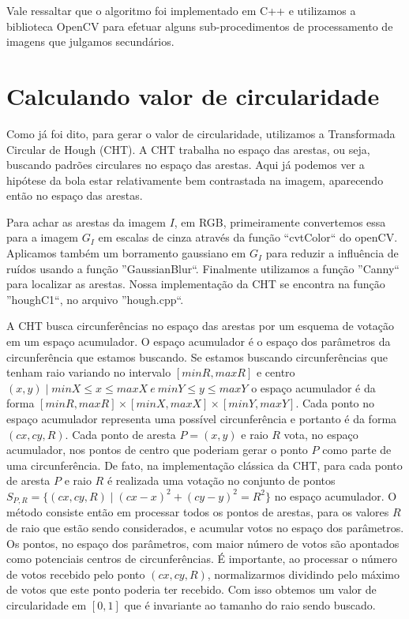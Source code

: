 \documentclass[11pt,a4paper]{article}
\begin{document}
Vale ressaltar que o algoritmo foi implementado em C++ e utilizamos a biblioteca OpenCV para efetuar alguns sub-procedimentos de processamento de imagens que julgamos secundários.

\section{Calculando valor de circularidade}

 Como já foi dito, para gerar o valor de circularidade, utilizamos a Transformada Circular de Hough (CHT). A CHT trabalha no espaço das arestas, ou seja, buscando padrões circulares no espaço das arestas. Aqui já podemos ver a hipótese da bola estar relativamente bem contrastada na imagem, aparecendo então no espaço das arestas.

 Para achar as arestas da imagem $I$, em RGB, primeiramente convertemos essa para a imagem $G_I$ em escalas de cinza através da função ``cvtColor`` do openCV. Aplicamos também um borramento gaussiano em $G_I$ para reduzir a influência de ruídos usando a função ''GaussianBlur``. Finalmente utilizamos a função ''Canny`` para localizar as arestas. Nossa implementação da CHT se encontra na função ''houghC1``, no arquivo ''hough.cpp``.

 A CHT busca circunferências no espaço das arestas por um esquema de votação em um espaço acumulador. O espaço acumulador é o espaço dos parâmetros da circunferência que estamos buscando. Se estamos buscando circunferências que tenham raio variando no intervalo $[minR,maxR]$ e centro $(x,y) \mid minX \leq x \leq maxX ~e~ minY \leq y \leq maxY $ o espaço acumulador é da forma $[minR,maxR]\times[minX,maxX]\times[minY,maxY]$. Cada ponto no espaço acumulador representa uma possível circunferência e portanto é da forma $(cx,cy,R)$. Cada ponto de aresta $P = (x,y)$ e raio $R$ vota, no espaço acumulador, nos pontos de centro que poderiam gerar o ponto $P$ como parte de uma circunferência. De fato, na implementação clássica da CHT, para cada ponto de aresta $P$ e raio $R$ é realizada uma votação no conjunto de pontos $S_{P,R} = \{ (cx,cy,R) \mid (cx - x)^2 + (cy - y)^2 = R^2\}$ no espaço acumulador. O método consiste então em processar todos os pontos de arestas, para os valores $R$ de raio que estão sendo considerados, e acumular votos no espaço dos parâmetros. Os pontos, no espaço dos parâmetros, com maior número de votos são apontados como potenciais centros de circunferências. É importante, ao processar o número de votos recebido pelo ponto $(cx,cy,R)$, normalizarmos dividindo pelo máximo de votos que este ponto poderia ter recebido. Com isso obtemos um valor de circularidade em $[0,1]$ que é invariante ao tamanho do raio sendo buscado.
\end{document}
